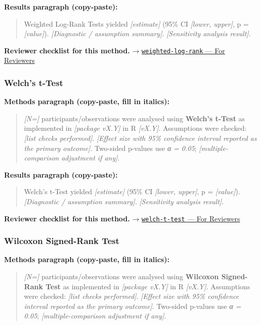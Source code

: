 \documentclass[
]{article}
\begin{document}
\textbf{Results paragraph (copy-paste):}

\begin{quote}
Weighted Log-Rank Tests yielded \emph{{[}estimate{]}} (95\% CI
\emph{{[}lower, upper{]}}, p = \emph{{[}value{]}}). \emph{{[}Diagnostic
/ assumption summary{]}}. \emph{{[}Sensitivity analysis result{]}}.
\end{quote}

\textbf{Reviewer checklist for this method.} →
\href{../chapters/11-survival/weighted-log-rank.Rmd\#for-reviewers}{\texttt{weighted-log-rank}
--- For Reviewers}

\subsubsection{Welch's t-Test}\label{welchs-t-test}

\textbf{Methods paragraph (copy-paste, fill in italics):}

\begin{quote}
\emph{{[}N={]}} participants/observations were analysed using
\textbf{Welch's t-Test} as implemented in \emph{{[}package vX.Y{]}} in R
\emph{{[}vX.Y{]}}. Assumptions were checked: \emph{{[}list checks
performed{]}}. \emph{{[}Effect size with 95\% confidence interval
reported as the primary outcome{]}}. Two-sided p-values use \emph{α =
0.05}; \emph{{[}multiple-comparison adjustment if any{]}}.
\end{quote}

\textbf{Results paragraph (copy-paste):}

\begin{quote}
Welch's t-Test yielded \emph{{[}estimate{]}} (95\% CI \emph{{[}lower,
upper{]}}, p = \emph{{[}value{]}}). \emph{{[}Diagnostic / assumption
summary{]}}. \emph{{[}Sensitivity analysis result{]}}.
\end{quote}

\textbf{Reviewer checklist for this method.} →
\href{../chapters/04-inferential/welch-t-test.Rmd\#for-reviewers}{\texttt{welch-t-test}
--- For Reviewers}

\subsubsection{Wilcoxon Signed-Rank
Test}\label{wilcoxon-signed-rank-test}

\textbf{Methods paragraph (copy-paste, fill in italics):}

\begin{quote}
\emph{{[}N={]}} participants/observations were analysed using
\textbf{Wilcoxon Signed-Rank Test} as implemented in \emph{{[}package
vX.Y{]}} in R \emph{{[}vX.Y{]}}. Assumptions were checked: \emph{{[}list
checks performed{]}}. \emph{{[}Effect size with 95\% confidence interval
reported as the primary outcome{]}}. Two-sided p-values use \emph{α =
0.05}; \emph{{[}multiple-comparison adjustment if any{]}}.
\end{quote}
\end{document}

